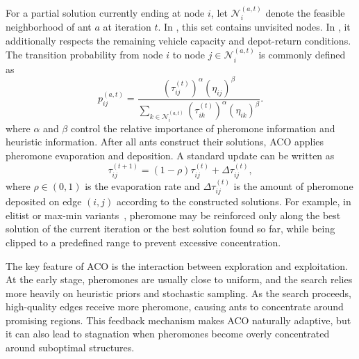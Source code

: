 For a partial solution currently ending at node $i$, let $\mathcal{N}_i^{(a,t)}$ denote the feasible neighborhood of ant $a$ at iteration $t$. In \TSP{}, this set contains unvisited nodes. In \CVRP{}, it additionally respects the remaining vehicle capacity and depot-return conditions. The transition probability from node $i$ to node $j\in\mathcal{N}_i^{(a,t)}$ is commonly defined as
\begin{equation}
    p_{ij}^{(a,t)}
    =
    \frac{
    \left(\tau_{ij}^{(t)}\right)^{\alpha}
    \left(\eta_{ij}\right)^{\beta}
    }{
    \sum_{k\in\mathcal{N}_i^{(a,t)}}
    \left(\tau_{ik}^{(t)}\right)^{\alpha}
    \left(\eta_{ik}\right)^{\beta}
    }.
    \label{eq:aco_transition}
\end{equation}
where $\alpha$ and $\beta$ control the relative importance of pheromone information and heuristic information. After all ants construct their solutions, ACO applies pheromone evaporation and deposition. A standard update can be written as
\begin{equation}
\tau_{ij}^{(t+1)}
=
(1-\rho)\tau_{ij}^{(t)}
+
\Delta\tau_{ij}^{(t)},
\label{eq:aco_update}
\end{equation}
where $\rho\in(0,1)$ is the evaporation rate and $\Delta\tau_{ij}^{(t)}$ is the amount of pheromone deposited on edge $(i,j)$ according to the constructed solutions. For example, in elitist or max-min variants~\cite{maxmin}, pheromone may be reinforced only along the best solution of the current iteration or the best solution found so far, while being clipped to a predefined range to prevent excessive concentration.

The key feature of ACO is the interaction between exploration and exploitation. At the early stage, pheromones are usually close to uniform, and the search relies more heavily on heuristic priors and stochastic sampling. As the search proceeds, high-quality edges receive more pheromone, causing ants to concentrate around promising regions. This feedback mechanism makes ACO naturally adaptive, but it can also lead to stagnation when pheromones become overly concentrated around suboptimal structures.
